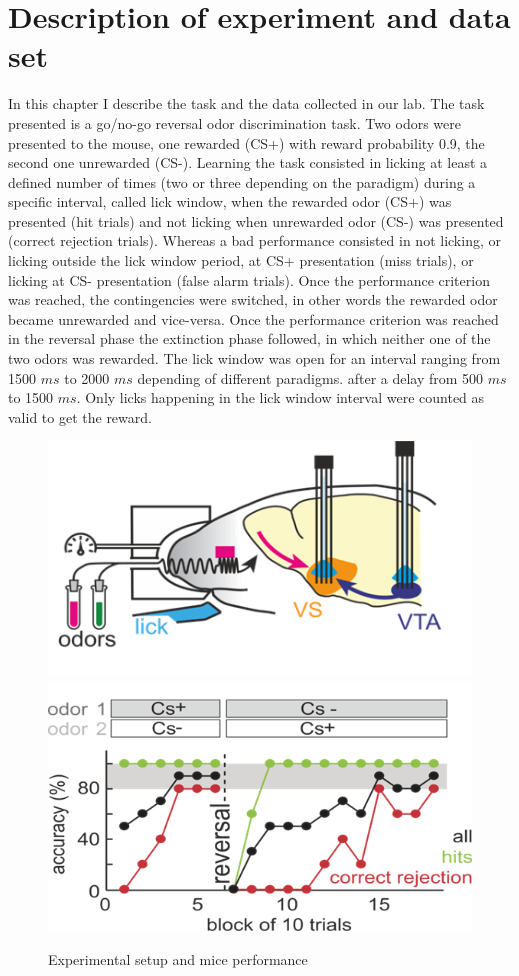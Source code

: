 \chapter{Description of experiment and data set}
In this chapter I describe the task and the data collected in our lab.
The task presented is a go/no-go reversal odor discrimination task. Two odors were presented to the mouse, one rewarded (CS+) with reward probability 0.9, the second one unrewarded (CS-). Learning the task consisted in licking at least a defined number of times (two or three depending on the paradigm) during a specific interval, called lick window, when the rewarded odor (CS+) was presented (hit trials) and not licking when unrewarded odor (CS-) was presented (correct rejection trials). Whereas a bad performance consisted in not licking, or licking outside the lick window period, at CS+ presentation (miss trials), or licking at CS- presentation (false alarm trials). Once the performance criterion was reached, the contingencies were switched, in other words the rewarded odor became unrewarded and vice-versa. Once the performance criterion was reached in the reversal phase the extinction phase followed, in which neither one of the two odors was rewarded. The lick window was open for an interval ranging from 1500 $ms$ to 2000 $ms$ depending of different paradigms. after a delay from 500 $ms$ to 1500 $ms$. Only licks happening in the lick window interval were counted as valid to get the reward.
\begin{figure}
    \centering
    \includegraphics[scale=0.7]{figures/Experiment.png}
    \includegraphics[scale=0.7]{figures/Performance.png}
    \caption{Experimental setup and mice performance}
    \label{fig:experiment}
\end{figure}
